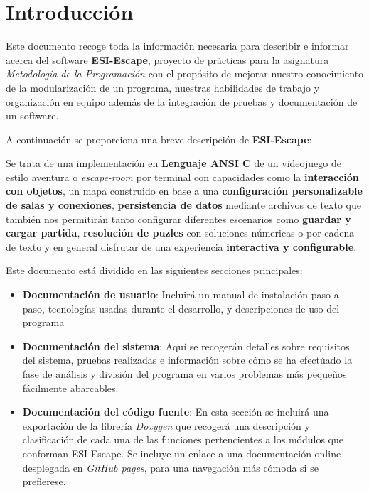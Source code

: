 \section{Introducción}


Este documento recoge toda la información necesaria para describir 
e informar acerca del software \textbf{ESI-Escape}, proyecto de prácticas para la asignatura \emph{Metodología de la Programación}
con el propósito de mejorar nuestro conocimiento de la modularización de un 
programa, nuestras habilidades de trabajo y organización en equipo 
además de la integración de pruebas y documentación de un software. 

A continuación se proporciona una breve descripción de \textbf{ESI-Escape}:

\bigskip

Se trata de una implementación en \textbf{Lenguaje ANSI C} de 
un videojuego de estilo aventura o \emph{escape-room} por terminal con capacidades como la 
\textbf{interacción con objetos}, un mapa construido en base a una \textbf{configuración personalizable de salas y conexiones}, 
\textbf{persistencia de datos} mediante archivos de texto que también 
nos permitirán tanto configurar diferentes escenarios como \textbf{guardar y cargar partida}, 
\textbf{resolución de puzles} con soluciones númericas o por cadena de texto y en general disfrutar
de una experiencia \textbf{interactiva y configurable}.

\bigskip

Este documento está dividido en las siguientes secciones principales:
\begin{itemize}
\item \textbf{Documentación de usuario}: Incluirá un manual de instalación paso a paso, tecnologías usadas durante el desarrollo, y descripciones de uso del programa
\item \textbf{Documentación del sistema}: Aquí se recogerán detalles 
sobre requisitos del sistema, pruebas realizadas e información 
sobre cómo se ha efectúado la fase de análisis y división del programa 
en varios problemas más pequeños fácilmente abarcables.
\item \textbf{Documentación del código fuente}: En esta sección se incluirá
una exportación de la librería \emph{Doxygen} que recogerá 
una descripción y clasificación de cada una de las funciones  
pertencientes a los módulos que conforman ESI-Escape. Se incluye un enlace a una 
documentación online desplegada en \emph{GitHub pages}, para una navegación más cómoda si
se prefierese.
\end{itemize}

